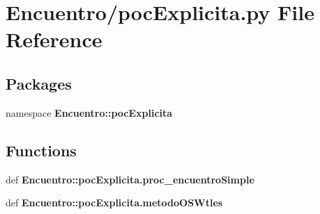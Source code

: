 \section{\-Encuentro/poc\-Explicita.py \-File \-Reference}
\label{poc_explicita_8py}
\subsection*{\-Packages}
\begin{DoxyCompactItemize}
\item 
namespace {\bf \-Encuentro\-::poc\-Explicita}
\end{DoxyCompactItemize}
\subsection*{\-Functions}
\begin{DoxyCompactItemize}
\item 
def {\bf \-Encuentro\-::poc\-Explicita.\-proc\-\_\-encuentro\-Simple}
\item 
def {\bf \-Encuentro\-::poc\-Explicita.\-metodo\-O\-S\-Wtles}
\end{DoxyCompactItemize}
